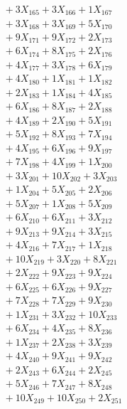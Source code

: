 \documentclass[a4paper,10pt]{article}
\begin{document}
{\begin{align}
&\;  + 3 X_{165} + 3 X_{166} + 1 X_{167} \\[0.5ex]\allowbreak
&\;  + 3 X_{168} + 3 X_{169} + 5 X_{170} \\[0.3ex]
&\;  + 9 X_{171} + 9 X_{172} + 2 X_{173} \\[0.3ex]
&\;  + 6 X_{174} + 8 X_{175} + 2 X_{176} \\[0.3ex]
&\;  + 4 X_{177} + 3 X_{178} + 6 X_{179} \\[0.3ex]
&\;  + 4 X_{180} + 1 X_{181} + 1 X_{182} \\[0.3ex]
&\;  + 2 X_{183} + 1 X_{184} + 4 X_{185} \\[0.3ex]
&\;  + 6 X_{186} + 8 X_{187} + 2 X_{188} \\[0.3ex]
&\;  + 4 X_{189} + 2 X_{190} + 5 X_{191} \\[0.3ex]
&\;  + 5 X_{192} + 8 X_{193} + 7 X_{194} \\[0.3ex]
&\;  + 4 X_{195} + 6 X_{196} + 9 X_{197} \\[0.5ex]\allowbreak
&\;  + 7 X_{198} + 4 X_{199} + 1 X_{200} \\[0.3ex]
&\;  + 3 X_{201} + 10 X_{202} + 3 X_{203} \\[0.3ex]
&\;  + 1 X_{204} + 5 X_{205} + 2 X_{206} \\[0.3ex]
&\;  + 5 X_{207} + 1 X_{208} + 5 X_{209} \\[0.3ex]
&\;  + 6 X_{210} + 6 X_{211} + 3 X_{212} \\[0.3ex]
&\;  + 9 X_{213} + 9 X_{214} + 3 X_{215} \\[0.3ex]
&\;  + 4 X_{216} + 7 X_{217} + 1 X_{218} \\[0.3ex]
&\;  + 10 X_{219} + 3 X_{220} + 8 X_{221} \\[0.3ex]
&\;  + 2 X_{222} + 9 X_{223} + 9 X_{224} \\[0.3ex]
&\;  + 6 X_{225} + 6 X_{226} + 9 X_{227} \\[0.5ex]\allowbreak
&\;  + 7 X_{228} + 7 X_{229} + 9 X_{230} \\[0.3ex]
&\;  + 1 X_{231} + 3 X_{232} + 10 X_{233} \\[0.3ex]
&\;  + 6 X_{234} + 4 X_{235} + 8 X_{236} \\[0.3ex]
&\;  + 1 X_{237} + 2 X_{238} + 3 X_{239} \\[0.3ex]
&\;  + 4 X_{240} + 9 X_{241} + 9 X_{242} \\[0.3ex]
&\;  + 2 X_{243} + 6 X_{244} + 2 X_{245} \\[0.3ex]
&\;  + 5 X_{246} + 7 X_{247} + 8 X_{248} \\[0.3ex]
&\;  + 10 X_{249} + 10 X_{250} + 2 X_{251}\nonumber
\end{align}
}
\end{document}
